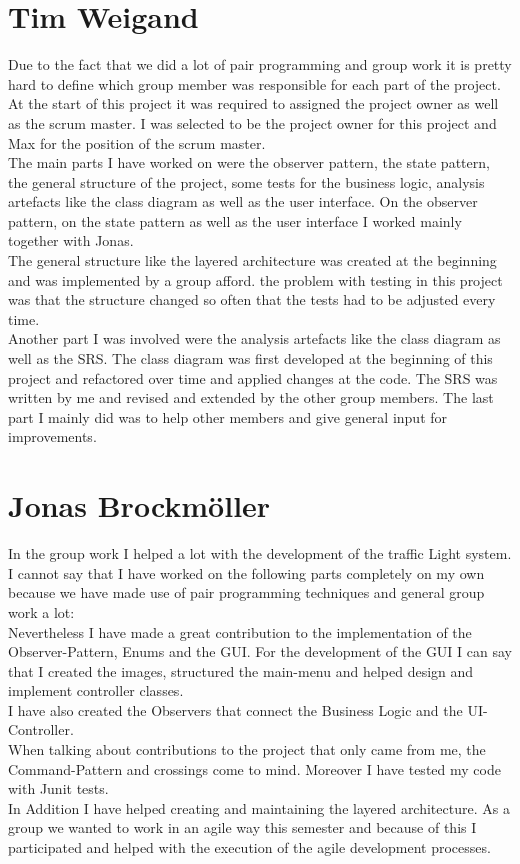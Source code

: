 \documentclass{report}
\begin{document}
    \section{Tim Weigand}

    Due to the fact that we did a lot of pair programming and group work it is pretty hard to define which group member was responsible for each part of the project.\\
    At the start of this project it was required to assigned the project owner as well as the scrum master. I was selected to be the project owner for this project and Max for the position of the scrum master.\\
    The main parts I have worked on were the observer pattern, the state pattern, the general structure of the project, some tests for the business logic, analysis artefacts like the class diagram as well as the user interface.
    On the observer pattern, on the state pattern as well as the user interface I worked mainly together with Jonas.\\
    The general structure like the layered architecture was created at the beginning and was implemented by a group afford. the problem with testing in this project was that the structure changed so often that the tests had to be adjusted every time.\\
    Another part I was involved were the analysis artefacts like the class diagram as well as the SRS. The class diagram was first developed at the beginning of this project and refactored over time and applied changes at the code. The SRS was written by me and revised and extended by the other group members. The last part I mainly did was to help other members and give general input for improvements.


    \section{Jonas Brockmöller}

    In the group work I helped a lot with the development of the traffic Light system. I cannot say that I have worked on the following parts completely on my own because we have made use of pair programming techniques and general group work a lot: \\
    Nevertheless I have made a great contribution to the implementation of the Observer-Pattern, Enums and the GUI. For the development of the GUI I can say that I created the images, structured the main-menu and helped design and implement controller classes. \\
    I have also created the Observers that connect the Business Logic and the UI-Controller.\\
    When talking about contributions to the project that only came from me, the Command-Pattern and crossings come to mind. Moreover I have tested my code with Junit tests.\\
    In Addition I have helped creating and maintaining the layered architecture. As a group we wanted to work in an agile way this semester and because of this I participated and helped with the execution of the agile development processes. \\
\end{document}
